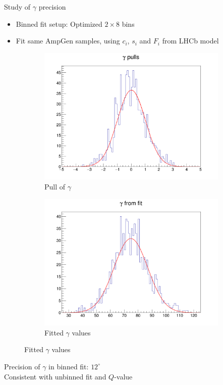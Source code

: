 \documentclass{beamer}
\begin{document}
\begin{frame}{Study of $\gamma$ precision}
  \begin{itemize}
    \item{Binned fit setup: Optimized $2\times 8$ bins}
    \item{Fit same AmpGen samples, using $c_i$, $s_i$ and $F_i$ from LHCb model}
  \end{itemize}
  \begin{figure}
    \centering
    \vspace{-0.2cm}
    \begin{subfigure}{0.5\textwidth}
      \includegraphics[width = 1.0\textwidth]{Plots/BinnedFit_gamma_pull.png}
      \caption{Pull of $\gamma$}
    \end{subfigure}%
    \begin{subfigure}{0.5\textwidth}
      \includegraphics[width = 1.0\textwidth]{Plots/BinnedFit_gamma_fitted.png}
      \caption{Fitted $\gamma$ values}
    \end{subfigure}
  \end{figure}
  \begin{center}
    Precision of $\gamma$ in binned fit: $12^\circ$ \\
    Consistent with unbinned fit and $Q$-value
  \end{center}
\end{frame}
\end{document}
